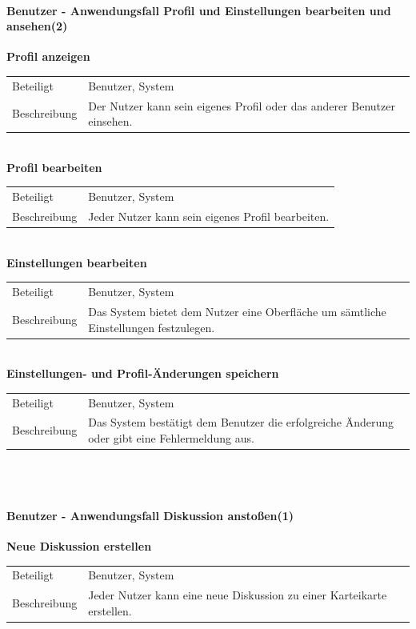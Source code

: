 \documentclass[12pt,a4paper]{article}
\begin{document}
\paragraph{Benutzer - Anwendungsfall \glqq Profil und Einstellungen bearbeiten und ansehen\grqq  (2)}\mbox{}

\textbf{Profil anzeigen}\\
\begin{tabular}{l|p{12cm}}
	\hline 
	Beteiligt & Benutzer, System \\ 
	Beschreibung & Der Nutzer kann sein eigenes Profil oder das anderer Benutzer einsehen. \\ 
\end{tabular}\\

\textbf{Profil bearbeiten}\\
\begin{tabular}{l|p{12cm}}
	\hline 
	Beteiligt & Benutzer, System \\ 
	Beschreibung & Jeder Nutzer kann sein eigenes Profil bearbeiten. \\ 
\end{tabular}\\ 

\textbf{Einstellungen bearbeiten}\\
\begin{tabular}{l|p{12cm}}
	\hline 
	Beteiligt & Benutzer, System \\ 
	Beschreibung & Das System bietet dem Nutzer eine Oberfläche um sämtliche Einstellungen festzulegen. \\ 
\end{tabular}\\

\textbf{Einstellungen- und Profil-Änderungen speichern}\\
\begin{tabular}{l|p{12cm}}
	\hline 
	Beteiligt &  Benutzer, System \\ 
	Beschreibung & Das System bestätigt dem Benutzer die erfolgreiche Änderung oder gibt eine Fehlermeldung aus. \\ 
\end{tabular}\\\


\paragraph{Benutzer - Anwendungsfall \glqq Diskussion anstoßen\grqq (1)}\mbox{}

\textbf{Neue Diskussion erstellen}\\
\begin{tabular}{l|p{12cm}}
	\hline 
	Beteiligt & Benutzer, System \\ 
	Beschreibung & Jeder Nutzer kann eine neue Diskussion zu einer Karteikarte erstellen. \\ 
\end{tabular}\\
\end{document}
